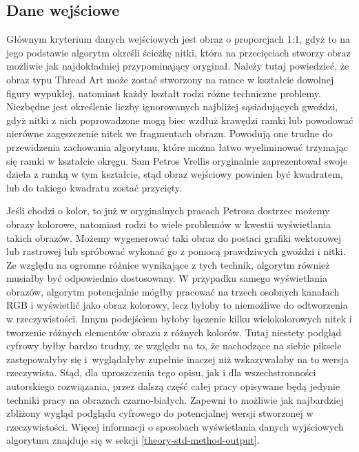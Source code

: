         \subsection{Dane wejściowe} \label{theory-std-method-input}
        Głównym kryterium danych wejściowych jest obraz o proporcjach 1:1, gdyż to na jego podstawie algorytm określi ścieżkę nitki, która na przecięciach stworzy obraz możliwie jak najdokładniej przypominający oryginał. Należy tutaj powiedzieć, że obraz typu Thread Art może zostać stworzony na ramce w kształcie dowolnej figury wypukłej, natomiast każdy kształt rodzi różne techniczne problemy. Niezbędne jest określenie liczby ignorowanych najbliżej sąsiadujących gwoździ, gdyż nitki z nich poprowadzone mogą biec wzdłuż krawędzi ramki lub powodować nierówne zagęszczenie nitek we fragmentach obrazu. Powodują one trudne do przewidzenia zachowania algorytmu, które można łatwo wyeliminować trzymając się ramki w kształcie okręgu. Sam Petros Vrellis oryginalnie zaprezentował swoje dzieła z ramką w tym kształcie, stąd obraz wejściowy powinien być kwadratem, lub do takiego kwadratu zostać przycięty. 
        
        Jeśli chodzi o kolor, to już w oryginalnych pracach Petrosa dostrzec możemy obrazy kolorowe, natomiast rodzi to wiele problemów w kwestii wyświetlania takich obrazów. Możemy wygenerować taki obraz do postaci grafiki wektorowej lub rastrowej lub spróbować wykonać go z pomocą prawdziwych gwoździ i nitki. Ze względu na ogromne różnice wynikające z tych technik, algorytm również musiałby być odpowiednio dostosowany. W przypadku samego wyświetlania obrazów, algorytm potencjalnie mógłby pracować na trzech osobnych kanałach RGB i wyświetlić jako obraz kolorowy, lecz byłoby to niemożliwe do odtworzenia w rzeczywistości. Innym podejściem byłoby łączenie kilku wielokolorowych nitek i tworzenie różnych elementów obrazu z różnych kolorów. Tutaj niestety podgląd cyfrowy byłby bardzo trudny, ze względu na to, że nachodzące na siebie piksele zastępowałyby się i~wyglądałyby zupełnie inaczej niż wskazywałaby na to wersja rzeczywista. Stąd, dla uproszczenia tego opisu, jak i dla wszechstronności autorskiego rozwiązania, przez dalszą część całej pracy opisywane będą jedynie techniki pracy na obrazach czarno-białych. Zapewni to możliwie jak najbardziej zbliżony wygląd podglądu cyfrowego do potencjalnej wersji stworzonej w rzeczywistości. Więcej informacji o sposobach wyświetlania danych wyjściowych algorytmu znajduje się w sekcji \ref{theory-std-method-output}.
        
